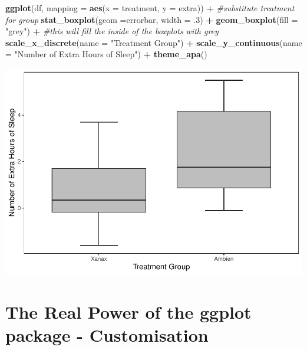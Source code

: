 \documentclass[
]{book}
\newenvironment{Shaded}{\begin{snugshade}}{\end{snugshade}}
\newcommand{\AttributeTok}[1]{\textcolor[rgb]{0.13,0.29,0.53}{#1}}
\newcommand{\CommentTok}[1]{\textcolor[rgb]{0.56,0.35,0.01}{\textit{#1}}}
\newcommand{\DecValTok}[1]{\textcolor[rgb]{0.00,0.00,0.81}{#1}}
\newcommand{\FunctionTok}[1]{\textcolor[rgb]{0.13,0.29,0.53}{\textbf{#1}}}
\newcommand{\NormalTok}[1]{#1}
\newcommand{\SpecialCharTok}[1]{\textcolor[rgb]{0.81,0.36,0.00}{\textbf{#1}}}
\newcommand{\StringTok}[1]{\textcolor[rgb]{0.31,0.60,0.02}{#1}}
\begin{document}
\begin{Shaded}
\begin{Highlighting}[]
\FunctionTok{ggplot}\NormalTok{(df, }\AttributeTok{mapping =} \FunctionTok{aes}\NormalTok{(}\AttributeTok{x =}\NormalTok{ treatment, }\AttributeTok{y =}\NormalTok{ extra)) }\SpecialCharTok{+} \CommentTok{\#substitute treatment for group}
  \FunctionTok{stat\_boxplot}\NormalTok{(}\AttributeTok{geom =}\StringTok{\textquotesingle{}errorbar\textquotesingle{}}\NormalTok{, }\AttributeTok{width =}\NormalTok{ .}\DecValTok{3}\NormalTok{) }\SpecialCharTok{+}
  \FunctionTok{geom\_boxplot}\NormalTok{(}\AttributeTok{fill =} \StringTok{"grey"}\NormalTok{) }\SpecialCharTok{+} \CommentTok{\#this will fill the inside of the boxplots with grey}
  \FunctionTok{scale\_x\_discrete}\NormalTok{(}\AttributeTok{name =} \StringTok{"Treatment Group"}\NormalTok{) }\SpecialCharTok{+} 
  \FunctionTok{scale\_y\_continuous}\NormalTok{(}\AttributeTok{name =} \StringTok{"Number of Extra Hours of Sleep"}\NormalTok{) }\SpecialCharTok{+}
  \FunctionTok{theme\_apa}\NormalTok{()}
\end{Highlighting}
\end{Shaded}

\includegraphics{rintro_demo_files/figure-latex/unnamed-chunk-292-1.pdf}

\hypertarget{the-real-power-of-the-ggplot-package---customisation}{%
\section{The Real Power of the ggplot package - Customisation}\label{the-real-power-of-the-ggplot-package---customisation}}
\end{document}
